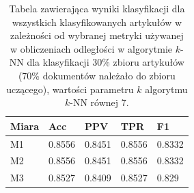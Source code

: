 \documentclass{classrep}
\begin{document}
\begin{table}[H]
    \centering
\caption{Tabela zawierająca wyniki klasyfikacji dla wszystkich klasyfikowanych artykułów w zależności od wybranej metryki
używanej w obliczeniach odległości w algorytmie $k$-NN dla klasyfikacji 30\% zbioru
artykułów (70\% dokumentów należało do zbioru uczącego), wartości parametru $k$
algorytmu $k$-NN równej 7.}
\begin{adjustbox}{max width=\textwidth}
    \begin{tabular}{|l|l|l|l|l|}
    \hline
        Miara & Acc & PPV & TPR & F1 \\ \hline
        M1 & 0.8556 & 0.8451 & 0.8556 & 0.8332 \\ \hline
        M2 & 0.8556 & 0.8451 & 0.8556 & 0.8332 \\ \hline
        M3 & 0.8527 & 0.8409 & 0.8527 & 0.829 \\ \hline
    \end{tabular}
\end{adjustbox}
\end{table}
\end{document}
